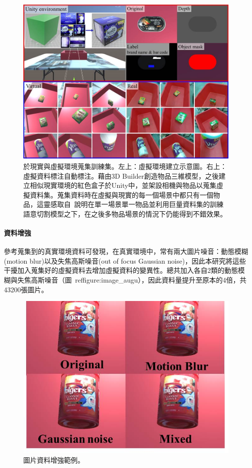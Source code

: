 \begin{figure}[H]
	\centering
	\includegraphics[height=!, width=0.9\linewidth, keepaspectratio=true]
	{./figures/real_and_vir_environment.jpg}
  \caption{於現實與虛擬環境蒐集訓練集。左上：虛擬環境建立示意圖。右上：虛擬資料標注自動標注。藉由3D Builder創造物品三維模型，之後建立相似現實環境的紅色盒子於Unity中，並架設相機與物品以蒐集虛擬資料集。蒐集資料時在虛擬與現實的每一個場景中都只有一個物品，這靈感取自~\cite{zeng2016multi}說明在單一場景單一物品並利用巨量資料集的訓練語意切割模型之下，在之後多物品場景的情況下仍能得到不錯效果。}
  \label{figure:benchmark-dataset}
\end{figure}

\paragraph{資料增強}
參考蒐集到的真實環境資料可發現，在真實環境中，常有兩大圖片噪音：動態模糊(motion blur)以及失焦高斯噪音(out of focus Gaussian noise)，因此本研究將這些干擾加入蒐集好的虛擬資料去增加虛擬資料的變異性。總共加入各自2類的動態模糊與失焦高斯噪音（圖~ref{figure:image_augu}），因此資料量提升至原本的4倍，共43200張圖片。

\begin{figure}[H]
	\centering
	\includegraphics[height=!, width=0.9\linewidth, keepaspectratio=true]
	{./figures/image_augu.jpg}
  \caption{圖片資料增強範例。}
  \label{figure:image_augu}
\end{figure}


